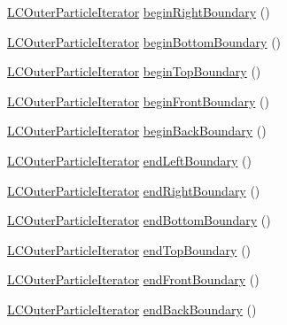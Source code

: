 \begin{DoxyCompactItemize}
\item 
\hyperlink{classutils_1_1LCOuterParticleIterator}{L\-C\-Outer\-Particle\-Iterator} \hyperlink{classutils_1_1LCParticleContainer_ac81ec31d9b9d943fcaa12b6f5180346a}{begin\-Right\-Boundary} ()
\item 
\hyperlink{classutils_1_1LCOuterParticleIterator}{L\-C\-Outer\-Particle\-Iterator} \hyperlink{classutils_1_1LCParticleContainer_ae37f1773ead38d2e360433c42d0e8212}{begin\-Bottom\-Boundary} ()
\item 
\hyperlink{classutils_1_1LCOuterParticleIterator}{L\-C\-Outer\-Particle\-Iterator} \hyperlink{classutils_1_1LCParticleContainer_ad1f146863fba5392055214dda9674458}{begin\-Top\-Boundary} ()
\item 
\hyperlink{classutils_1_1LCOuterParticleIterator}{L\-C\-Outer\-Particle\-Iterator} \hyperlink{classutils_1_1LCParticleContainer_ac65bb09975dd42fe1ca612b69c0c0ab2}{begin\-Front\-Boundary} ()
\item 
\hyperlink{classutils_1_1LCOuterParticleIterator}{L\-C\-Outer\-Particle\-Iterator} \hyperlink{classutils_1_1LCParticleContainer_a01246c970ac1fd9fd304e49ccb2e961f}{begin\-Back\-Boundary} ()
\item 
\hyperlink{classutils_1_1LCOuterParticleIterator}{L\-C\-Outer\-Particle\-Iterator} \hyperlink{classutils_1_1LCParticleContainer_a3b10115b6b8af604c09b1cf5f56d9abc}{end\-Left\-Boundary} ()
\item 
\hyperlink{classutils_1_1LCOuterParticleIterator}{L\-C\-Outer\-Particle\-Iterator} \hyperlink{classutils_1_1LCParticleContainer_a6a4a2f5ebee204235fd319ff2d3f3ee0}{end\-Right\-Boundary} ()
\item 
\hyperlink{classutils_1_1LCOuterParticleIterator}{L\-C\-Outer\-Particle\-Iterator} \hyperlink{classutils_1_1LCParticleContainer_ab90ef3504dfef56070dec3ac44bd1d44}{end\-Bottom\-Boundary} ()
\item 
\hyperlink{classutils_1_1LCOuterParticleIterator}{L\-C\-Outer\-Particle\-Iterator} \hyperlink{classutils_1_1LCParticleContainer_a378eaf969d141deafb421a72affb792b}{end\-Top\-Boundary} ()
\item 
\hyperlink{classutils_1_1LCOuterParticleIterator}{L\-C\-Outer\-Particle\-Iterator} \hyperlink{classutils_1_1LCParticleContainer_a2007d2ff431dcff0ded21167b1bbc52f}{end\-Front\-Boundary} ()
\item 
\hyperlink{classutils_1_1LCOuterParticleIterator}{L\-C\-Outer\-Particle\-Iterator} \hyperlink{classutils_1_1LCParticleContainer_a9a18d047b8b2afc2a106a75d62e281ce}{end\-Back\-Boundary} ()
\item 

\end{DoxyCompactItemize}
